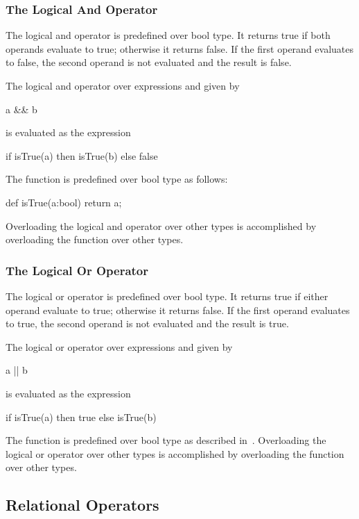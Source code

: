 \subsubsection{The Logical And Operator}
\label{Logical_And_Operators}

The logical and operator is predefined over bool type.  It returns
true if both operands evaluate to true; otherwise it returns false.
If the first operand evaluates to false, the second operand is not
evaluated and the result is false.

The logical and operator over expressions  and  given
by
\begin{chapel}
a && b
\end{chapel}
is evaluated as the expression
\begin{chapel}
if isTrue(a) then isTrue(b) else false
\end{chapel}

The function  is predefined over bool type as follows:
\begin{chapel}
def isTrue(a:bool) return a;
\end{chapel}
Overloading the logical and operator over other types is accomplished
by overloading the  function over other types.

\subsubsection{The Logical Or Operator}
\label{Logical_Or_Operators}

The logical or operator is predefined over bool type.  It returns
true if either operand evaluate to true; otherwise it returns false.
If the first operand evaluates to true, the second operand is not
evaluated and the result is true.

The logical or operator over expressions  and  given
by
\begin{chapel}
a || b
\end{chapel}
is evaluated as the expression
\begin{chapel}
if isTrue(a) then true else isTrue(b)
\end{chapel}

The function  is predefined over bool type as described
in~.  Overloading the logical or operator
over other types is accomplished by overloading the 
function over other types.

\subsection{Relational Operators}
\label{Relational_Operators}

